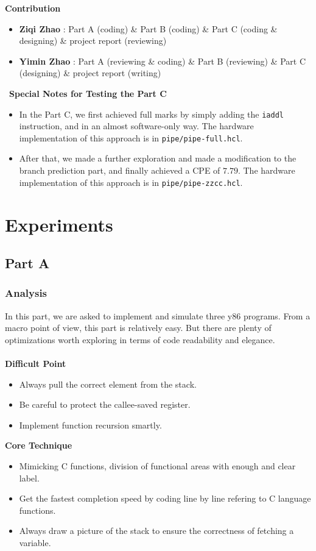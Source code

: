 \documentclass{article}
\begin{document}
\textbf{Contribution}
\begin{itemize}
	\item \textbf{Ziqi Zhao} : Part A (coding) \& Part B (coding) \& Part C (coding \& designing) \& project report (reviewing)
	\item \textbf{Yimin Zhao} : Part A (reviewing \& coding) \& Part B (reviewing) \& Part C (designing) \& project report (writing)
\end{itemize}
\
\textbf{Special Notes for Testing the Part C}
\begin{itemize}
	\item In the Part C, we first achieved full marks by simply adding the \texttt{iaddl} instruction, and in an almost software-only way. The hardware implementation of this approach is in \texttt{pipe/pipe-full.hcl}.
	\item After that, we made a further exploration and made a modification to the branch prediction part, and finally achieved a CPE of $7.79$. {\color{blue}The hardware implementation of this approach is in \texttt{pipe/pipe-zzcc.hcl}.}
\end{itemize}

\section{Experiments}
\subsection{Part A}
\subsubsection{Analysis}
In this part, we are asked to implement and simulate three y86 programs. 
From a macro point of view, this part is relatively easy. 
But there are plenty of optimizations worth exploring in terms of code readability and elegance.\\\\
\textbf{Difficult Point} 
\begin{itemize}
        \item Always pull the correct element from the stack.
        \item Be careful to protect the callee-saved register.
        \item Implement function recursion smartly.
\end{itemize}
\textbf{Core Technique}
\begin{itemize}
        \item Mimicking C functions, division of functional areas with enough and clear label.
        \item Get the fastest completion speed by coding line by line refering to C language functions.
        \item Always draw a picture of the stack to ensure the correctness of fetching a variable.
\end{itemize}
\end{document}
